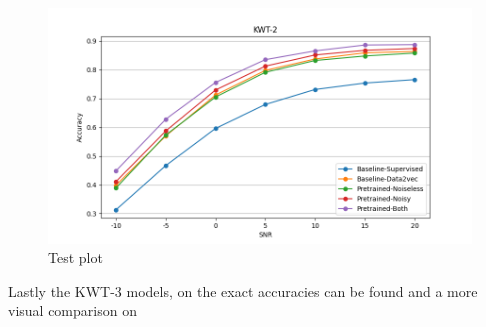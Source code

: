 \begin{figure}[H]
    \centering
    \includegraphics[width=\textwidth]{incl/img/results/kwt2_busxbbl.png}
    \caption{Test plot}
    \label{fig:KWT-2_snrmix_busxbbl}
\end{figure}

Lastly the KWT-3 models, on  the exact accuracies can be found and a more visual comparison on 

